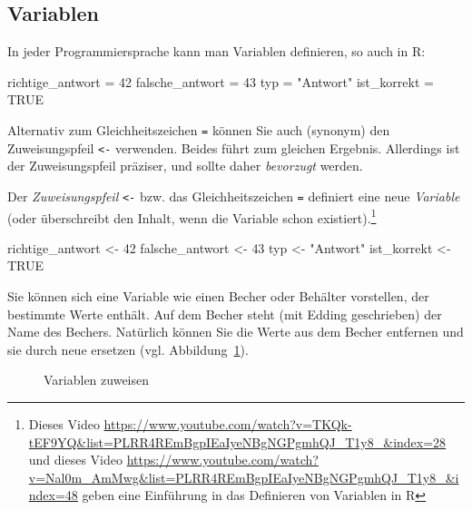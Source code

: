 \documentclass[
  a4paper,
]{scrbook}
\newenvironment{Shaded}{\begin{snugshade}}{\end{snugshade}}
\newcommand{\ConstantTok}[1]{\textcolor[rgb]{0.56,0.35,0.01}{#1}}
\newcommand{\DecValTok}[1]{\textcolor[rgb]{0.68,0.00,0.00}{#1}}
\newcommand{\NormalTok}[1]{\textcolor[rgb]{0.00,0.23,0.31}{#1}}
\newcommand{\OtherTok}[1]{\textcolor[rgb]{0.00,0.23,0.31}{#1}}
\newcommand{\StringTok}[1]{\textcolor[rgb]{0.13,0.47,0.30}{#1}}
\theoremstyle{definition}
\theoremstyle{definition}
\theoremstyle{definition}
\theoremstyle{remark}
\begin{document}
\subsection{Variablen}\label{sec-rvars}

In jeder Programmiersprache kann man Variablen definieren, so auch in R:

\begin{Shaded}
\begin{Highlighting}[]
\NormalTok{richtige\_antwort }\OtherTok{=} \DecValTok{42}
\NormalTok{falsche\_antwort }\OtherTok{=} \DecValTok{43}
\NormalTok{typ }\OtherTok{=} \StringTok{"Antwort"}
\NormalTok{ist\_korrekt }\OtherTok{=} \ConstantTok{TRUE}
\end{Highlighting}
\end{Shaded}

Alternativ zum Gleichheitszeichen \texttt{=} können Sie auch (synonym)
den Zuweisungspfeil \texttt{\textless{}-} verwenden. Beides führt zum
gleichen Ergebnis. Allerdings ist der Zuweisungspfeil präziser, und
sollte daher \emph{bevorzugt} werden.

Der \emph{Zuweisungspfeil} \texttt{\textless{}-} bzw. das
Gleichheitszeichen \texttt{=} definiert eine neue \emph{Variable} (oder
überschreibt den Inhalt, wenn die Variable schon existiert).\footnote{Dieses
  Video
  \url{https://www.youtube.com/watch?v=TKQk-tEF9YQ&list=PLRR4REmBgpIEaIyeNBgNGPgmhQJ_T1y8_&index=28}
  und dieses Video
  \url{https://www.youtube.com/watch?v=Nal0m_AmMwg&list=PLRR4REmBgpIEaIyeNBgNGPgmhQJ_T1y8_&index=48}
  geben eine Einführung in das Definieren von Variablen in R}

\begin{Shaded}
\begin{Highlighting}[]
\NormalTok{richtige\_antwort }\OtherTok{\textless{}{-}} \DecValTok{42}
\NormalTok{falsche\_antwort }\OtherTok{\textless{}{-}} \DecValTok{43}
\NormalTok{typ }\OtherTok{\textless{}{-}} \StringTok{"Antwort"}
\NormalTok{ist\_korrekt }\OtherTok{\textless{}{-}} \ConstantTok{TRUE}
\end{Highlighting}
\end{Shaded}

Sie können sich eine Variable wie einen Becher oder Behälter vorstellen,
der bestimmte Werte enthält. Auf dem Becher steht (mit Edding
geschrieben) der Name des Bechers. Natürlich können Sie die Werte aus
dem Becher entfernen und sie durch neue ersetzen (vgl.
Abbildung~\ref{fig-def-vars}).

\begin{figure}


\caption{\label{fig-def-vars}Variablen zuweisen}

\end{figure}%
\end{document}
